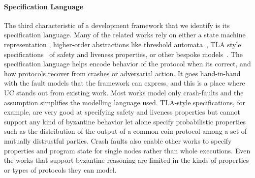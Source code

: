 \paragraph{Specification Language}
The third characteristic of a development framework that we identify is its
specification language.  Many of the related works rely on either a state
machine representation \cite{killian2007mace}, higher-order abstractions like
threshold automata~\cite{tholoniat2022formal}, TLA style
specifications~\cite{hawblitze2015ironfleet, bolosky2007farsite} of safety and
liveness properties, or other bespoke models~\cite{wilcox2015verdi}.  The
specification language helps encode behavior of the protocol when its correct,
and how protocols recover from crashes or adversarial action.  It goes
hand-in-hand with the fault models that the framework can express, and this is
a place where UC stands out from existing work.  Most works model only
crash-faults and the assumption simplifies the modelling language used.
TLA-style specifications, for example, are very good at specifying safety and
liveness properties but cannot support any kind of byzantine behavior let alone
specify probabilistic properties such as the distribution of the output of a
common coin protocol among a set of mutually distrustful parties.  Crash faults
also enable other works to specify properties and program state for single
nodes rather than whole executions.  Even the works that support byzantine
reasoning are limited in the kinds of properties or types of protocols they can
model.

